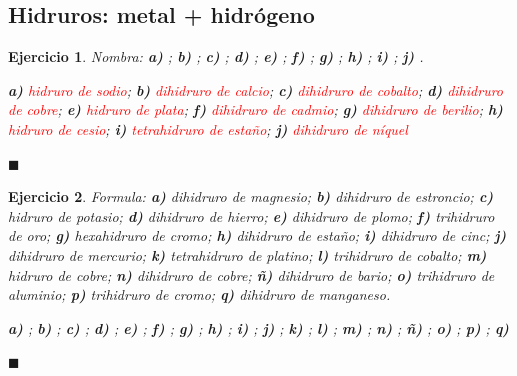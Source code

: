 \documentclass[12pt]{article}
\theoremstyle{mygreennumbox}
\newtheorem{ejercicioT}{Ejercicio}[section]
\newenvironment{exercise}{\begin{eBoxmygreen}\begin{ejercicioT}}{\hfill{\color{mygreen}\tiny\ensuremath{\blacksquare}}\end{ejercicioT}\end{eBoxmygreen}}
\begin{document}
\subsection{Hidruros: metal + hidrógeno}

\begin{exercise}
    Nombra: \textbf{a)} ; \textbf{b)} ; \textbf{c)} ; \textbf{d)} ; \textbf{e)} ; \textbf{f)} ; \textbf{g)} ; \textbf{h)} ; \textbf{i)} ; \textbf{j)} .
    \begin{solu}
        \textbf{a)} \textcolor{red}{hidruro de sodio}; \textbf{b)} \textcolor{red}{dihidruro de calcio}; \textbf{c)} \textcolor{red}{dihidruro de cobalto}; \textbf{d)} \textcolor{red}{dihidruro de cobre}; \textbf{e)} \textcolor{red}{hidruro de plata}; \textbf{f)} \textcolor{red}{dihidruro de cadmio}; \textbf{g)} \textcolor{red}{dihidruro de berilio}; \textbf{h)} \textcolor{red}{hidruro de cesio}; \textbf{i)} \textcolor{red}{tetrahidruro de estaño}; \textbf{j)} \textcolor{red}{dihidruro de níquel}
    \end{solu}
\end{exercise}

\begin{exercise}
    Formula: \textbf{a)} dihidruro de magnesio; \textbf{b)} dihidruro de estroncio; \textbf{c)} hidruro de potasio; \textbf{d)} dihidruro de hierro; \textbf{e)} dihidruro de plomo; \textbf{f)} trihidruro de oro; \textbf{g)} hexahidruro de cromo; \textbf{h)} dihidruro de estaño; \textbf{i)} dihidruro de cinc; \textbf{j)} dihidruro de mercurio; \textbf{k)} tetrahidruro de platino; \textbf{l)} trihidruro de cobalto; \textbf{m)} hidruro de cobre; \textbf{n)} dihidruro de cobre; \textbf{ñ)} dihidruro de bario; \textbf{o)} trihidruro de aluminio; \textbf{p)} trihidruro de cromo; \textbf{q)} dihidruro de manganeso.
    \begin{solu}
        \textbf{a)} \textcolor{red}{}; \textbf{b)} \textcolor{red}{}; \textbf{c)} \textcolor{red}{}; \textbf{d)} \textcolor{red}{}; \textbf{e)} \textcolor{red}{}; \textbf{f)} \textcolor{red}{}; \textbf{g)} \textcolor{red}{}; \textbf{h)} \textcolor{red}{}; \textbf{i)} \textcolor{red}{}; \textbf{j)} \textcolor{red}{}; \textbf{k)} \textcolor{red}{}; \textbf{l)} \textcolor{red}{}; \textbf{m)} \textcolor{red}{}; \textbf{n)} \textcolor{red}{}; \textbf{ñ)} \textcolor{red}{}; \textbf{o)} \textcolor{red}{}; \textbf{p)} \textcolor{red}{}; \textbf{q)} \textcolor{red}{}
    \end{solu}
\end{exercise}
\end{document}
